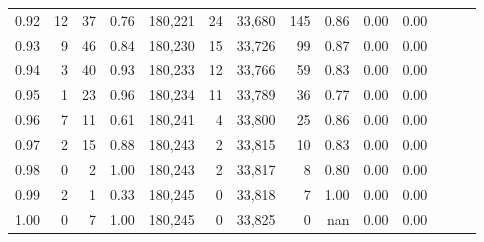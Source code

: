 \begin{tabular}{rrrrrrrrrrrrrr}
0.92 &      12 &   37 &  0.76 &  180,221 &       24 &  33,680 &     145 &  0.86 &  0.00 &      0.00 \\
0.93 &       9 &   46 &  0.84 &  180,230 &       15 &  33,726 &      99 &  0.87 &  0.00 &      0.00 \\
0.94 &       3 &   40 &  0.93 &  180,233 &       12 &  33,766 &      59 &  0.83 &  0.00 &      0.00 \\
0.95 &       1 &   23 &  0.96 &  180,234 &       11 &  33,789 &      36 &  0.77 &  0.00 &      0.00 \\
0.96 &       7 &   11 &  0.61 &  180,241 &        4 &  33,800 &      25 &  0.86 &  0.00 &      0.00 \\
0.97 &       2 &   15 &  0.88 &  180,243 &        2 &  33,815 &      10 &  0.83 &  0.00 &      0.00 \\
0.98 &       0 &    2 &  1.00 &  180,243 &        2 &  33,817 &       8 &  0.80 &  0.00 &      0.00 \\
0.99 &       2 &    1 &  0.33 &  180,245 &        0 &  33,818 &       7 &  1.00 &  0.00 &      0.00 \\
1.00 &       0 &    7 &  1.00 &  180,245 &        0 &  33,825 &       0 &   nan &  0.00 &      0.00 \\
\bottomrule
\end{tabular}
